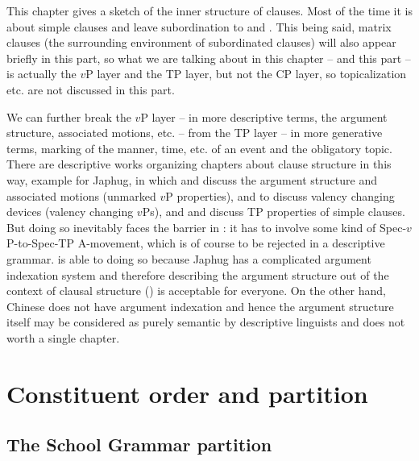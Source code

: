 \documentclass[../main.tex]{subfiles}
\begin{document}
This chapter gives a sketch of the inner structure of clauses.
Most of the time it is about simple clauses and leave subordination to 
 and .
This being said, matrix clauses (the surrounding environment of subordinated clauses)
will also appear briefly in this part, so what we are talking about in this chapter -- and this part -- is 
actually the $v$P layer and the TP layer, but not the CP layer, so topicalization etc. are not 
discussed in this part. 

We can further break the $v$P layer -- 
in more descriptive terms, the argument structure, associated motions, etc.
-- from the TP layer -- 
in more generative terms, marking of the manner, time, etc. of an event and the obligatory topic. 
There are descriptive works organizing chapters about clause structure in this way, 
example \citet{jacques2021grammar} for Japhug, 
in which  and  discuss the argument structure 
and associated motions (unmarked $v$P properties), 
and  to  discuss valency changing devices (valency changing $v$Ps), 
and  and  discuss TP properties of simple clauses. 
But doing so inevitably faces the barrier in : 
it has to involve some kind of Spec-$v$P-to-Spec-TP A-movement, 
which is of course to be rejected in a descriptive grammar. 
\citet{jacques2021grammar} is able to doing so 
because Japhug has a complicated argument indexation system 
and therefore describing the argument structure out of the context of clausal structure () 
is acceptable for everyone.
On the other hand, Chinese does not have argument indexation and hence 
the argument structure itself may be considered as purely semantic by descriptive linguists
and does not worth a single chapter.

\section{Constituent order and partition}\label{sec:clause-constituent-order-overview}

\subsection{The School Grammar partition}
\end{document}
